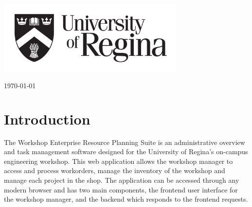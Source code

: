 \begin{titlepage}
	
	\vfill\vfill\vfill\vfill
	\includegraphics[width=0.7\textwidth]{UR.png}\\[2cm] %
	 

	
	\vfill\vfill\vfill %
	
	{\large\today} %
	
	
	\vfill %
	
\end{titlepage}



\newpage 
\tableofcontents

\newpage
\listoffigures


\newpage
\section{Introduction}
The Workshop Enterprise Resource Planning Suite is an administrative overview and task management software designed for the University of Regina's on-campus engineering workshop. This web application allows the workshop manager to access and process workorders, manage the inventory of the workshop and manage each project in the shop. The application can be accessed through any modern browser and has two main components, the frontend user interface for the workshop manager, and the backend which responds to the frontend requests. 

